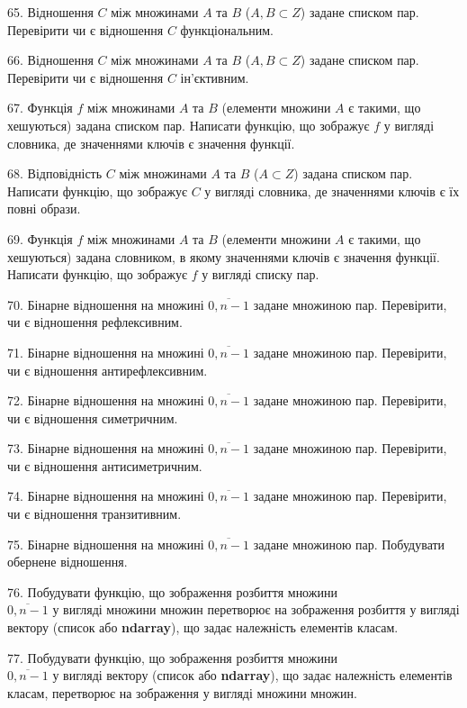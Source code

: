 \documentclass[10pt, ukrainian]{article}
\begin{document}
{\begin {Large}
65. Відношення $C$ між множинами $A$ та $B$ ($A, B\subset Z$) задане списком пар. Перевірити чи є відношення $C$ функціональним.

66. Відношення $C$ між множинами $A$ та $B$ ($A, B\subset Z$) задане списком пар. Перевірити чи є відношення $C$ ін'єктивним.

\newpage

67. Функція $f$ між множинами $A$ та $B$ (елементи множини $A$ є такими, що хешуються) задана списком пар. Написати функцію, що зображує $f$ у вигляді словника, де значеннями ключів є значення функції.

68. Відповідність $C$ між множинами $A$ та $B$ ($A\subset Z$) задана списком пар. Написати функцію, що зображує $C$ у вигляді словника, де значеннями ключів є їх повні образи.

69. Функція $f$ між множинами $A$ та $B$ (елементи множини $A$ є такими, що хешуються) задана словником, в якому значеннями ключів є значення функції. Написати функцію, що зображує $f$ у вигляді списку пар.

70. Бінарне відношення на множині $\overline{0,n-1}$ задане множиною пар. Перевірити, чи є відношення рефлексивним.

71. Бінарне відношення на множині $\overline{0,n-1}$ задане множиною пар. Перевірити, чи є відношення антирефлексивним.

72. Бінарне відношення на множині $\overline{0,n-1}$ задане множиною пар. Перевірити, чи є відношення симетричним.

73. Бінарне відношення на множині $\overline{0,n-1}$ задане множиною пар. Перевірити, чи є відношення антисиметричним.

74. Бінарне відношення на множині $\overline{0,n-1}$ задане множиною пар. Перевірити, чи є відношення транзитивним.

75. Бінарне відношення на множині $\overline{0,n-1}$ задане множиною пар. Побудувати обернене відношення.

76. Побудувати функцію, що зображення розбиття множини\\ $\overline{0,n-1}$  у вигляді множини множин перетворює на зображення розбиття у вигляді вектору (список або  \textbf{ndarray}), що задає належність елементів класам.

77. Побудувати функцію, що зображення розбиття множини\\ $\overline{0,n-1}$  у вигляді вектору (список або  \textbf{ndarray}), що задає належність елементів класам, перетворює на зображення у вигляді множини множин.


\end{Large}}
\end{document}
